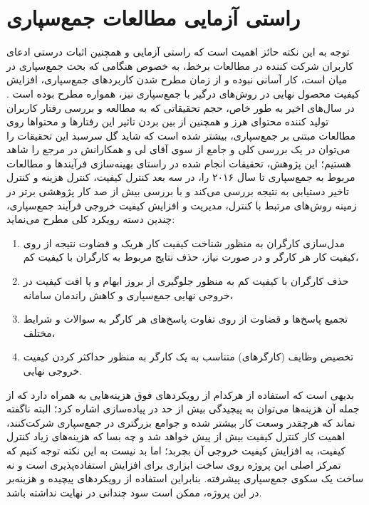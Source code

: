 \section{راستی آزمایی مطالعات جمع‌سپاری}
توجه به این نکته حائز اهمیت است که راستی آزمایی و همچنین اثبات درستی ادعای کاربران شرکت کننده در مطالعات برخط، به خصوص هنگامی که بحث جمع‌سپاری در میان است، کار آسانی نبوده و از زمان مطرح شدن کاربردهای جمع‌سپاری، افزایش کیفیت محصول نهایی در روش‌های درگیر با جمع‌سپاری نیز، همواره مطرح بوده است
\cite{li_crowdsourced_2016}.
در سال‌های اخیر به طور خاص، حجم تحقیقاتی که به مطالعه و بررسی رفتار کاربران تولید کننده محتوای هرز و همچنین از بین بردن تاثیر این رفتارها و محتواها روی مطالعات مبتنی بر جمع‌سپاری، بیشتر شده است که شاید گل سرسبد این تحقیقات را می‌توان در یک بررسی کلی و جامع از سوی آقای لی و همکارانش در مرجع
\cite{li_crowdsourced_2016}
را شاهد هستیم؛ این پژوهش، تحقیقات انجام شده در راستای بهینه‌سازی فرآیندها و مطالعات مربوط به جمع‌سپاری تا سال ۲۰۱۶ را، در سه بعد کنترل کیفیت، کنترل هزینه و کنترل تاخیر دستیابی به نتیجه بررسی می‌کند و با بررسی بیش از صد کار پژوهشی برتر در زمینه روش‌های مرتبط با کنترل، مدیریت و افزایش کیفیت خروجی فرآیند جمع‌سپاری، چندین دسته رویکرد کلی مطرح می‌نماید:
\begin{enumerate}
	\item 
	مدل‌سازی کارگران به منظور شناخت کیفیت کار هریک و قضاوت نتیجه از روی کیفیت کار هر کارگر و در صورت نیاز، حذف نتایج مربوط به کارگران با کیفیت کم،
	\item 
	حذف کارگران  با کیفیت کم به منظور جلوگیری از بروز ابهام و یا افت کیفیت در خروجی نهایی جمع‌سپاری و کاهش راندمان سامانه،
	\item 
	تجمیع پاسخ‌ها و قضاوت از روی تفاوت پاسخ‌های هر کارگر به سوالات و شرایط مختلف،
	\item 
	تخصیص وظایف (کارگرهای) متناسب به یک کارگر به منظور حداکثر کردن کیفیت خروجی نهایی.
\end{enumerate}
بدیهی است که استفاده از هرکدام از رویکرد‌های فوق هزینه‌هایی به همراه دارد که از جمله آن هزینه‌ها می‌توان به پیچیدگی بیش‌ از حد در پیاده‌سازی اشاره کرد؛ البته ناگفته نماند که هرچقدر وسعت کار بیشتر شده و جوامع بزرگتری در جمع‌سپاری شرکت‌کنند، اهمیت کار کنترل کیفیت بیش از پیش خواهد شد و چه بسا که هزینه‌های زیاد کنترل کیفیت، به افزایش کیفیت خروجی آن بچربد؛ اما بد نیست به این نکته توجه کنیم که تمرکز اصلی این پروژه روی ساخت ابزاری برای افزایش استفاده‌پذیری است و نه ساخت یک سکوی جمع‌سپاری پیشرفته. بنابراین استفاده از رویکردهای پیچیده و هزینه‌بر در این پروژه، ممکن است سود چندانی در نهایت نداشته باشد.\\
